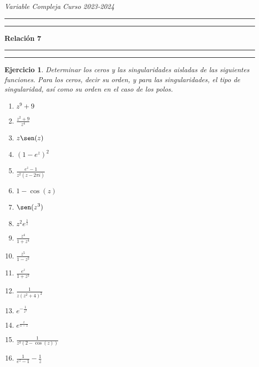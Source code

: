 \documentclass[11pt]{report}
\newtheorem{ejercicio}{Ejercicio}
\begin{document}


\textit{Variable Compleja} \hfill \textit{Curso 2023-2024}

\vspace{-5mm}

\begin{center}

	\rule{\textwidth}{1.6pt}\vspace*{-\baselineskip}\vspace*{2pt} %
	\rule{\textwidth}{0.4pt} %
	
	{\LARGE \textbf{Relación 7}} %
	
	\rule[0.66\baselineskip]{\textwidth}{0.4pt}\vspace*{-\baselineskip}\vspace{3.2pt} %
	\rule[0.66\baselineskip]{\textwidth}{1.6pt} %

\end{center}


\begin{ejercicio}
  Determinar los ceros y las singularidades aisladas de las siguientes funciones. Para los ceros, decir su orden, y para las singularidades, el tipo de singularidad, así como su orden en el caso de los polos.

  \begin{multicols}{3}
    \begin{enumerate}
      \item $\displaystyle z^9+9$
      \item $\displaystyle \frac{z^2+9}{z^4}$
      \item $\displaystyle z\sen(z)$
      \item $\displaystyle (1-e^z)^2$
      \item $\displaystyle \frac{e^z-1}{z^2(z-2\pi i)}$
      \item $\displaystyle 1-\cos(z)$
      \item $\displaystyle \sen(z^3)$
      \item $\displaystyle z^2e^{\frac{1}{z}}$
      \item $\displaystyle \frac{z^4}{1+z^4}$
      \item $\displaystyle \frac{z^5}{1-z^2}$
      \item $\displaystyle \frac{e^z}{1+z^2}$
      \item $\displaystyle \frac{1}{z(z^2+4)^2}$
      \item $\displaystyle e^{-\frac{1}{z^2}}$
      \item $\displaystyle e^{\frac{z}{1-z}}$
      \item $\displaystyle \frac{1}{z^3(2-\cos(z))}$
      \item $\displaystyle \frac{1}{e^z-1}-\frac{1}{z}$
    \end{enumerate}
  \end{multicols}
\end{ejercicio}
\end{document}
